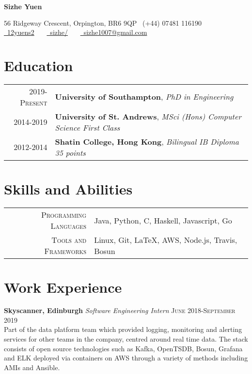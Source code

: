 \documentclass{article}
\begin{document}
\pagestyle{empty} %


\par{\centering
		{\Large \textbf{Sizhe Yuen}
	}\par}

\begin{center}
56 Ridgeway Crescent, Orpington, BR6 9QP \faMobile\ (+44) 07481 116190\\
\href{https://github.com/12yuens2}{\faGithub\ 12yuens2}
\ \ \ \href{https://www.linkedin.com/in/sizhe/}{\faLinkedin\ sizhe/}
\ \ \ \href{mailto:sizhe1007@gmail.com}{\faEnvelopeO\ sizhe1007@gmail.com}
\end{center}


\section*{Education}
\begin{tabular}{r|p{15cm}}
\textsc{2019-Present} & \textbf{University of Southampton}, \textit{PhD in Engineering}
\\
\textsc{2014-2019} & \textbf{University of St. Andrews}, \textit{MSci (Hons) Computer Science First Class}
\\
\textsc{2012-2014} & \textbf{Shatin College, Hong Kong}, \textit{Bilingual IB Diploma 35 points}
\end{tabular}

\section*{Skills and Abilities}
\begin{tabular}{r|p{15cm}}
\textsc{Programming Languages} & Java, Python, C, Haskell, Javascript, Go\\

\textsc{Tools and Frameworks} & Linux, Git, \LaTeX, AWS, Node.js, Travis, Bosun
\end{tabular}

\section*{Work Experience}
\textbf{Skyscanner, Edinburgh} \textit{Software Engineering Intern}
\hfill
\textsc{June 2018-September 2019} \\
Part of the data platform team which provided logging, monitoring and alerting services for
other teams in the company, centred around real time data. The stack consists of open source
technologies such as Kafka, OpenTSDB, Bosun, Grafana and ELK deployed via containers on AWS
through a variety of methods including AMIs and Ansible.
\end{document}
